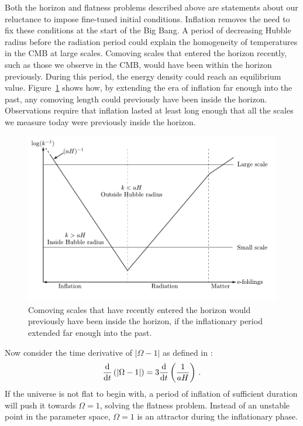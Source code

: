 Both the horizon and flatness problems described above are statements about our
reluctance to impose fine-tuned initial conditions. Inflation removes the need
to fix these conditions at the start of the Big Bang.
A period of decreasing Hubble radius before the radiation period could explain the
homogeneity of temperatures in the CMB at large scales.
Comoving scales that entered the horizon recently, such as
those we observe in the CMB, would have been within the horizon previously. 
During this period, the energy density could reach an equilibrium
value.
Figure~\ref{fig:comovingscales-intro} shows how, by extending
the era of inflation far enough into the past, any comoving length could
previously have been inside the horizon.
Observations require that inflation lasted at least long enough that all the
scales we measure today were previously inside the horizon. 
% 
\begin{figure}[htbp]
\centering
 \includegraphics[width=\textwidth]{graphs/scales.pdf}
 \caption[Comoving Scales and the Hubble Radius]{Comoving scales that have recently
entered the horizon would
previously have been inside the horizon, if the inflationary period extended far
enough into the past.}
 \label{fig:comovingscales-intro}
\end{figure}
% 

Now consider the time derivative of $|\Omega -1|$ as defined in
:
% 
\begin{equation}
 \label{eq:omegaderiv-intro}
 \frac{\mathrm{d}}{\mathrm{d} t}\left(|\Omega -1 |\right) = 3\frac{\mathrm{d}}{\mathrm{d} t}
\left(\frac{1}{aH}\right)\,.
\end{equation}
% 
If the universe is not flat to begin with, a period of inflation of sufficient
duration will push it
towards $\Omega=1$, solving the flatness problem. Instead of an unstable point
in the parameter space, $\Omega=1$ is an attractor during the inflationary
phase. 
% 

